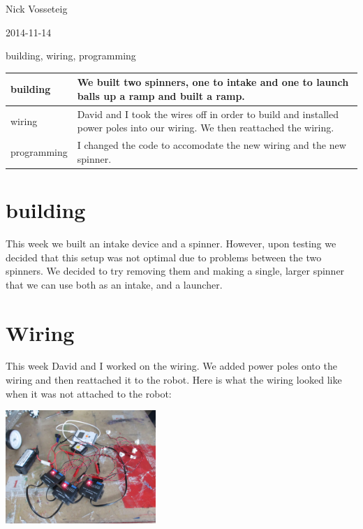 Nick Vosseteig

2014-11-14

building, wiring, programming

\begin{tabular}{|p{5cm}|p{5cm}|}
 \hline
 building&
We built two spinners, one to intake and one to launch balls up a ramp and built a ramp.
 \\
 \hline
wiring&
David and I took the wires off in order to build and installed power poles into our wiring. We then reattached the wiring.
 \\
 \hline
programming&
I changed the code to accomodate the new wiring and the new spinner.
 \\
 \hline
\end{tabular}

\section*{building}
This week we built an intake device and a spinner. However, upon testing we decided that this setup was not optimal due to problems between the two spinners. We decided to try removing them and making a single, larger spinner that we can use both as an intake, and a launcher.
\section*{Wiring}
This week David and I worked on the wiring. We added power poles onto the wiring and then reattached it to the robot. Here is what the wiring looked like when it was not attached to the robot:
\begin{center}
 \includegraphics[width=215px]{./Entries/Images/wiring1.jpg}
\end{center}